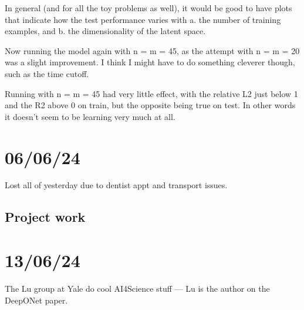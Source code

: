 \documentclass[11pt,a4paper]{article}
\begin{document}
In general (and for all the toy problems as well), it would be good to have plots that indicate how the test performance varies with a. the number of training examples, and b. the dimensionality of the latent space.

Now running the model again with n = m = 45, as the attempt with n = m = 20 was a slight improvement.
I think I might have to do something cleverer though, such as the time cutoff.

Running with n = m = 45 had very little effect, with the relative L2 just below 1 and the R2 above 0 on train, but the opposite being true on test.
In other words it doesn't seem to be learning very much at all.

\section{06/06/24}
 Lost all of yesterday due to dentist appt and transport issues.

 \subsection{Project work}

\section{13/06/24}

The Lu group at Yale do cool AI4Science stuff --- Lu is the author on the DeepONet paper.
\end{document}
